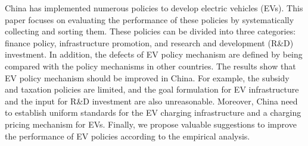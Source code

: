 China has implemented numerous policies to develop electric vehicles (EVs). This paper focuses on evaluating the performance of these policies by systematically collecting and sorting them. These policies can be divided into three categories: finance policy, infrastructure promotion, and research and development (R&D) investment. In addition, the defects of EV policy mechanism are defined by being compared with the policy mechanisms in other countries. The results show that EV policy mechanism should be improved in China. For example, the subsidy and taxation policies are limited, and the goal formulation for EV infrastructure and the input for R&D investment are also unreasonable. Moreover, China need to establish uniform standards for the EV charging infrastructure and a charging pricing mechanism for EVs. Finally, we propose valuable suggestions to improve the performance of EV policies according to the empirical analysis.
